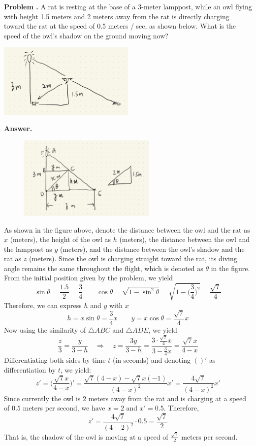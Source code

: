 \documentclass[11pt,letterpaper]{article}
\newcounter{problem}
\newcommand{\problem}{
	\stepcounter{problem}%
	\noindent \textbf{Problem \theproblem. }%
}
\newcommand{\answer}{\noindent \textbf{Answer. }}
\begin{document}
\newpage

\problem A rat is resting at the base of a 3-meter lamppost, while an owl flying with height 1.5 meters and 2 meters away from the rat is directly charging toward the rat at the speed of 0.5 meters / sec, as shown below.  What is the speed of the owl's shadow on the ground moving now? \vspace{6mm}

\begin{center}
    \includegraphics[width = 0.5\textwidth]{../graph/A12.png}
\end{center}

\answer
\begin{figure}[h]
    \centering
    \includegraphics[width = 0.6\textwidth]{../graph/A12_Sol_2.png}
\end{figure}

\noindent As shown in the figure above, denote the distance between the owl and the rat as $x$ (meters), the height of the owl as $h$ (meters), the distance between the owl and the lamppost as $y$ (meters), and the distance between the owl's shadow and the rat as $z$ (meters).  Since the owl is charging straight toward the rat, its diving angle remains the same throughout the flight, which is denoted as $\theta$ in the figure.  From the initial position given by the problem, we yield
\[\sin \theta = \frac{1.5}{2} = \frac{3}{4} \qquad \cos \theta = \sqrt{1-\sin^2\theta} = \sqrt{1-\Big(\frac{3}{4}\Big)^2} = \frac{\sqrt{7}}{4}\]
Therefore, we can express $h$ and $y$ with $x$
\[h = x\sin \theta = \frac{3}{4}x \qquad y = x \cos \theta = \frac{\sqrt{7}}{4}x\]
Now using the similarity of $\bigtriangleup ABC$ and $\bigtriangleup ADE$, we yield
\[\frac{z}{3} = \frac{y}{3-h} \quad \Rightarrow \quad z = \frac{3y}{3-h} = \frac{3\cdot \frac{\sqrt{7}}{4}x}{3-\frac{3}{4}x} = \frac{\sqrt{7}x}{4-x}\]
Differentiating both sides by time $t$ (in seconds) and denoting $()'$ as differentiation by $t$, we yield:
\[z' = \Big(\frac{\sqrt{7}x}{4-x}\Big)' = \frac{\sqrt{7}(4-x) - \sqrt{7}x(-1)}{(4-x)^2}x' = \frac{4\sqrt{7}}{(4-x)^2}x'\]
Since currently the owl is $2$ meters away from the rat and is charging at a speed of $0.5$ meters per second, we have $x = 2$ and $x' = 0.5$. Therefore,
\[z' = \frac{4\sqrt{7}}{(4-2)^2}\cdot 0.5 = \frac{\sqrt{7}}{2}\]
That is, the shadow of the owl is moving at a speed of $\frac{\sqrt{7}}{2}$ meters per second. \vspace{6mm}
\end{document}
